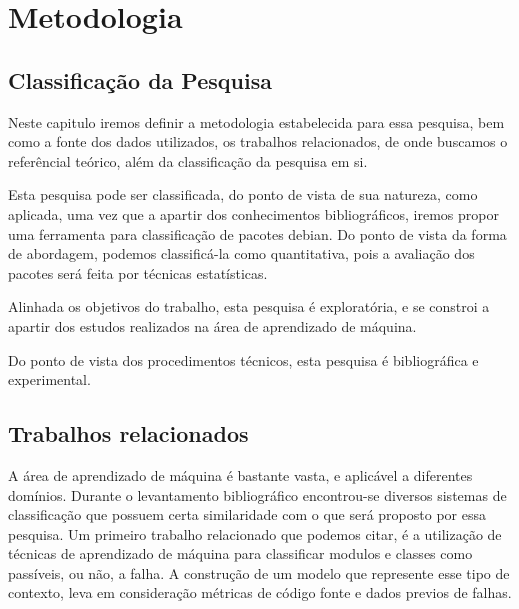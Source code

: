 \chapter{Metodologia}

\section{Classificação da Pesquisa}

Neste capitulo iremos definir a metodologia estabelecida para essa pesquisa, bem como
a fonte dos dados utilizados, os trabalhos relacionados, de onde buscamos o referêncial teórico,
além da classificação da pesquisa em si. 

Esta pesquisa pode ser classificada, do ponto de vista de sua natureza, como aplicada, uma vez que a apartir dos conhecimentos bibliográficos,
iremos propor uma ferramenta para classificação de pacotes debian. Do ponto de vista da forma de abordagem, podemos classificá-la como 
quantitativa, pois a avaliação dos pacotes será feita por técnicas estatísticas.

Alinhada os objetivos do trabalho, esta pesquisa é exploratória, e se constroi a apartir dos estudos realizados na área de aprendizado
de máquina.

Do ponto de vista dos procedimentos técnicos, esta pesquisa é bibliográfica e experimental.

\section{Trabalhos relacionados}

A área de aprendizado de máquina é bastante vasta, e aplicável a diferentes domínios. 
Durante o levantamento bibliográfico encontrou-se diversos sistemas de classificação que possuem certa similaridade com o que será proposto por essa pesquisa.
Um primeiro trabalho relacionado que podemos citar, é a utilização de técnicas de aprendizado de máquina para classificar modulos e classes como passíveis, ou não, a falha\cite{Malhotra}.  
A construção de um modelo que represente esse tipo de contexto, leva em consideração métricas de código fonte e dados previos de falhas\cite{Malhotra}.

